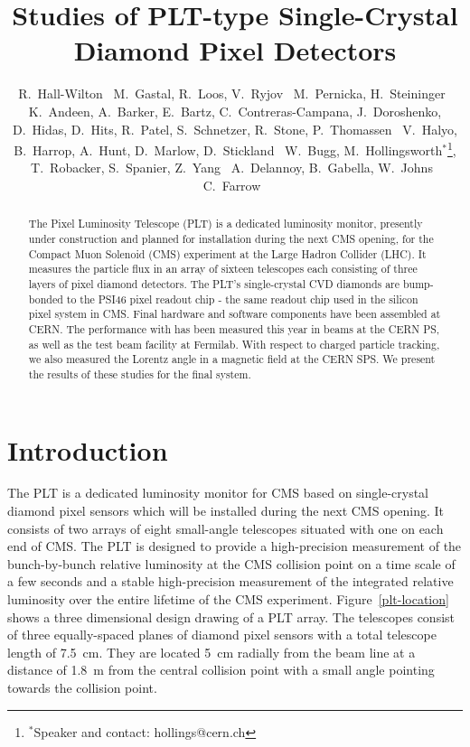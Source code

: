 \documentclass[journal]{IEEEtran}
\begin{document}
\title{Studies of PLT-type Single-Crystal Diamond Pixel Detectors}

\author{
R.~Hall-Wilton~
M.~Gastal, R.~Loos, V.~Ryjov~
M.~Pernicka, H.~Steininger~
K.~Andeen, A.~Barker, E.~Bartz, C.~Contreras-Campana, J.~Doroshenko, D.~Hidas, D.~Hits, R.~Patel, S.~Schnetzer, R.~Stone, P.~Thomassen~
V.~Halyo, B.~Harrop, A.~Hunt, D.~Marlow, D.~Stickland~
W.~Bugg, M.~Hollingsworth$^*$\thanks{$^*$Speaker and contact: hollings@cern.ch}, T.~Robacker,  S.~Spanier, Z.~Yang~
A.~Delannoy, B.~Gabella, W.~Johns~
C.~Farrow~%
}

\maketitle
\thispagestyle{empty}

\begin{abstract}
The Pixel Luminosity Telescope (PLT) is a dedicated luminosity monitor, presently under construction and planned for installation during the next CMS opening, for the Compact Muon Solenoid (CMS) experiment at the Large Hadron Collider (LHC). It measures the particle flux in an array of sixteen telescopes each consisting of three layers of pixel diamond detectors. The PLT's single-crystal CVD diamonds are bump-bonded to the PSI46 pixel readout chip - the same readout chip used in the silicon pixel system in CMS.  Final hardware and software components have been assembled at CERN.  
The performance with has been measured this year in beams at the CERN PS, as well as the test beam facility at Fermilab.  With respect to charged particle tracking, we also measured the Lorentz angle in a magnetic field at the CERN SPS.  We present the results of these studies for the final system. 
\end{abstract}

%
%
\section{Introduction}

The PLT is a dedicated luminosity monitor for CMS based
on single-crystal diamond pixel sensors which will be installed during the next CMS opening. It consists of two arrays of eight small-angle telescopes situated with one on 
each end of CMS.  The PLT is designed to provide a high-precision measurement of the bunch-by-bunch relative
luminosity at the CMS collision point on a time scale of a few seconds and a stable high-precision
measurement of the integrated relative luminosity over the entire lifetime of the CMS experiment.
 Figure~\ref{plt-location} shows a three dimensional design drawing 
of a PLT array. The telescopes consist of three equally-spaced planes of diamond pixel sensors with a total telescope 
length of 7.5~cm. They are located 5~cm radially from the beam line at a distance of 1.8~m from the central collision 
point with a small angle pointing towards the collision point.
\end{document}
